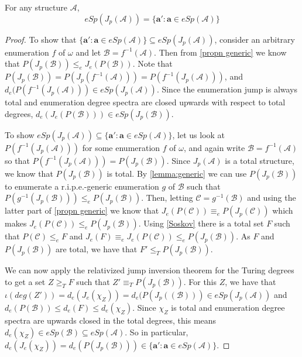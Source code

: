 \documentclass[11pt]{amsart}
\newcommand{\A}{{\mathcal{A}}}
\newcommand{\B}{{\mathcal{B}}}
\begin{document}
\begin{thm}\label{theorem_espjumps}
    For any structure $\A$,
    \begin{equation*}
        eSp(J_p(\A)) = \{ \mathbf{a'} : \mathbf{a} \in eSp(\A) \}
    \end{equation*}
\end{thm}

\begin{proof}
    To show that $\{ \mathbf{a'} : \mathbf{a} \in eSp(\A) \}\subseteq
    eSp(J_p(\A))$, consider an arbitrary enumeration $f$ of $\omega$ and let $\B
    = f^{-1}(\A)$. Then from \cref{propn generic} we know that $P(J_p(\B)) \leq_e J_e(P(\B))$. Note that $P(J_p(\B))=P(J_p(f^{-1}(\A))) = P(f^{-1}(J_p(\A)))$, and $d_e(P(f^{-1}(J_p(\A))) \in eSp(J_p(\A))$. Since the enumeration jump is always total and enumeration degree spectra are closed upwards with respect to total degrees, $d_e(J_e(P(\B))) \in eSp(J_p(\B))$. 
    
    To show $eSp(J_p(\A)) \subseteq \{ \mathbf{a'} : \mathbf{a} \in eSp(\A) \}$, let us look at $P(f^{-1}(J_p(\A)))$ for some enumeration $f$ of $\omega$, and again write $\B = f^{-1}(\A)$ so that $P(f^{-1}(J_p(\A))) = P(J_p(\B))$. Since $J_p(\A)$ is a total structure, we know that $P(J_p(\B))$ is total. By \cref{lemma:generic} we can use $P(J_p(\B))$ to enumerate a r.i.p.e.-generic enumeration $g$ of $\B$ such that $P(g^{-1}(J_p(\B))) \leq_e P(J_p(\B))$. Then, letting $\mathcal{C} = g^{-1}(\B)$ and using the latter part of \cref{propn generic} we know that $J_e(P(\mathcal{C})) \equiv_e P(J_p(\mathcal{C}))$ which makes $J_e(P(\mathcal{C})) \leq_e P(J_p(\B))$. Using \cref{Soskov} there is a total set $F$ such that $P(\mathcal{C}) \leq_e F$ and $J_e(F) \equiv_e J_e(P(\mathcal{C})) \leq_e P(J_p(\B))$.
    As $F$ and $P(J_p(\B))$ are total, we have that $F' \leq_T P(J_p(\B))$.
    
    We can now apply the relativized jump inversion theorem for the Turing degrees to get a set $Z\geq_T F$ such that $Z' \equiv_T P(J_p(\B))$. For this $Z$, we have that $\iota(deg(Z')) = d_e(J_e(\chi_Z)) = d_e(P(J_p((\B))) \in eSp(J_p(\A))$ and $d_e(P(\B)) \leq d_e(F) \leq d_e(\chi_Z)$. Since $\chi_Z$ is total and enumeration degree spectra are upwards closed in the total degrees, this means $d_e(\chi_Z) \in eSp(\B) \subseteq eSp(\A)$. So in particular, $d_e(J_e(\chi_Z))=d_e(P(J_p(\B)))\in \{\mathbf a': \mathbf a\in eSp(\A)\}$.
\end{proof}
\end{document}
